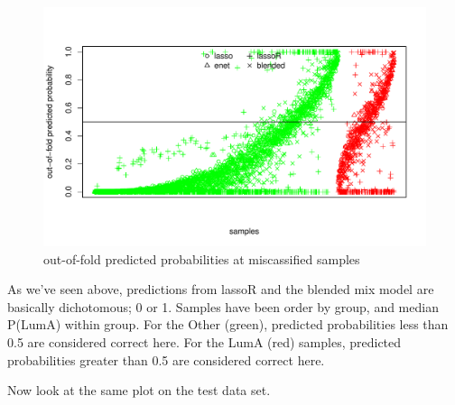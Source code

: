 \documentclass[
]{book}
\begin{document}
\begin{figure}
\centering
\includegraphics{Static/figures/brcaRna-glmnetFit-misclassTrain-1.pdf}
\caption{\label{fig:brcaRna-glmnetFit-misclassTrain}out-of-fold predicted probabilities at miscassified samples}
\end{figure}

As we've seen above, predictions from lassoR and the blended mix model
are basically dichotomous; 0 or 1. Samples have been order by group, and
median P(LumA) within group. For the Other (green), predicted probabilities
less than 0.5 are considered correct here. For the LumA (red) samples,
predicted probabilities greater than 0.5 are considered correct here.

Now look at the same plot on the test data set.
\end{document}
